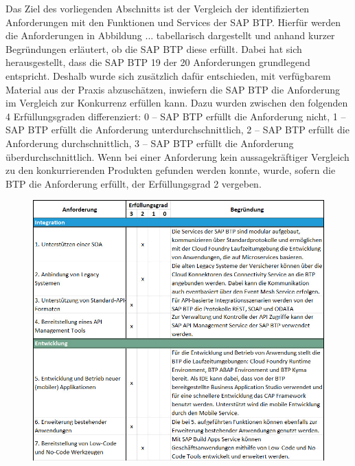 Das Ziel des vorliegenden Abschnitts ist der Vergleich der identifizierten Anforderungen mit den Funktionen und Services der SAP BTP. Hierfür werden die Anforderungen in Abbildung ... tabellarisch dargestellt und anhand kurzer Begründungen erläutert, ob die SAP BTP diese erfüllt. Dabei hat sich herausgestellt, dass die SAP BTP 19 der 20 Anforderungen grundlegend entspricht. Deshalb wurde sich zusätzlich dafür entschieden, mit verfügbarem Material aus der Praxis abzuschätzen, inwiefern die SAP BTP die Anforderung im Vergleich zur Konkurrenz erfüllen kann. Dazu wurden zwischen den folgenden 4 Erfüllungsgraden differenziert: 0 – SAP BTP erfüllt die Anforderung nicht, 1 – SAP BTP erfüllt die Anforderung unterdurchschnittlich, 2 – SAP BTP erfüllt die Anforderung durchschnittlich, 3 – SAP BTP erfüllt die Anforderung überdurchschnittlich. Wenn bei einer Anforderung kein aussagekräftiger Vergleich zu den konkurrierenden Produkten gefunden werden konnte, wurde, sofern die BTP die Anforderung erfüllt, der Erfüllungsgrad 2 vergeben.


\begin{figure}[ht]
    \centering
    \includegraphics[width=1\textwidth]{img/TTFTeil1E2.jpg}
    \label{fig:TTFTeil1}
\end{figure}

